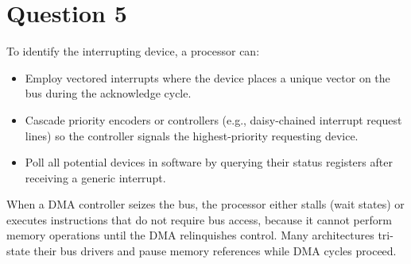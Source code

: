 \documentclass[12pt]{article}
\begin{document}
\section*{Question 5}
To identify the interrupting device, a processor can:
\begin{itemize}[leftmargin=*]
  \item Employ vectored interrupts where the device places a unique vector on the bus during the acknowledge cycle.
  \item Cascade priority encoders or controllers (e.g., daisy-chained interrupt request lines) so the controller signals the highest-priority requesting device.
  \item Poll all potential devices in software by querying their status registers after receiving a generic interrupt.
\end{itemize}

When a DMA controller seizes the bus, the processor either stalls (wait states) or executes instructions that do not require bus access, because it cannot perform memory operations until the DMA relinquishes control. Many architectures tri-state their bus drivers and pause memory references while DMA cycles proceed.
\end{document}
